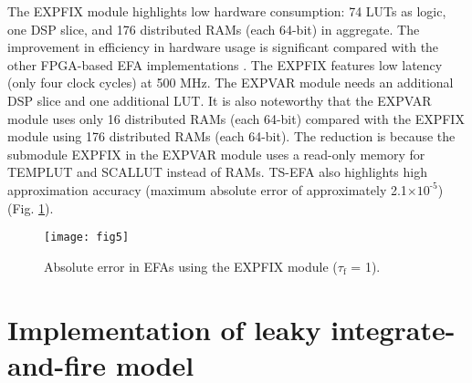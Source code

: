 \documentclass[10pt,journal]{IEEEtran}
\begin{document}
The EXP\textunderscore FIX module highlights low hardware consumption: 74 LUTs as logic, one DSP slice, and 176 distributed RAMs (each 64-bit) in aggregate. 
The improvement in efficiency in hardware usage is significant compared with the other FPGA-based EFA implementations  \cite{wielgosz2008highly,de2010floating,malik2015high,ortega2014high}.
The EXP\textunderscore FIX features low latency (only four clock cycles) at 500 MHz. 
The EXP\textunderscore VAR module needs an additional DSP slice and one additional LUT. 
It is also noteworthy that the EXP\textunderscore VAR module uses only 16 distributed RAMs (each 64-bit) compared with the EXP\textunderscore FIX module using 176 distributed RAMs (each 64-bit). 
The reduction is because the submodule EXP\textunderscore FIX in the EXP\textunderscore VAR module uses a read-only memory for TEMP\textunderscore LUT and SCAL\textunderscore LUT instead of RAMs.
TS-EFA also highlights high approximation accuracy (maximum absolute error of approximately 2.1$\times10^\textrm{-5}$) (Fig. \ref{fig:fig5}).

\begin{figure}[bh]\centering
    \texttt{[image: fig5]}
    \caption{\label{fig:fig5} Absolute error in EFAs using the EXP\textunderscore FIX module ($\tau_\textrm{f}$ = 1).}
\end{figure}


\section{Implementation of leaky integrate-and-fire model}\label{sec:impl_LIF}
\end{document}
